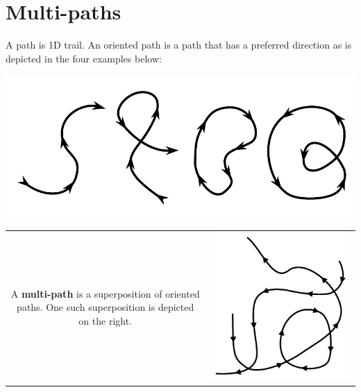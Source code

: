 \section{Multi-paths}

A path is 1D trail. An oriented path is a path that has a preferred direction as is depicted in the four examples below:
\begin{center}
\includegraphics[scale = 0.5]{Multi-structures/Multipaths/oriented_paths}
\end{center}

\begin{tabular}{cc}
\parbox{0.5\textwidth}{
A \textbf{multi-path} is a superposition of oriented paths. One such superposition is depicted on the right.
} & \parbox{0.5\textwidth}{
\includegraphics[scale = 0.7]{Multi-structures/Multipaths/multi-path_simple}
}
\end{tabular}

